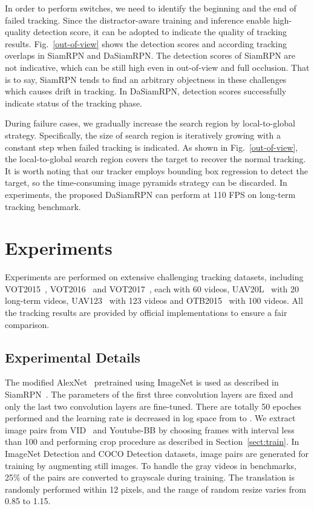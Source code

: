 \documentclass[runningheads]{llncs}
\begin{document}
In order to perform switches, we need to identify the beginning and the end of failed tracking. Since the distractor-aware training and inference enable high-quality detection score, it can be adopted to indicate the quality of tracking results. Fig.~\ref{out-of-view} shows the detection scores and according tracking overlaps in SiamRPN and DaSiamRPN. The detection scores of SiamRPN are not indicative, which can be still high even in out-of-view and full occlusion. That is to say, SiamRPN tends to find an arbitrary objectness in these challenges which causes drift in tracking. In DaSiamRPN, detection scores successfully indicate status of the tracking phase.

During failure cases, we gradually increase the search region by local-to-global strategy. Specifically, the size of search region is iteratively growing with a constant step when failed tracking is indicated. As shown in Fig.~\ref{out-of-view}, the local-to-global search region covers the target to recover the normal tracking. It is worth noting that our tracker employs bounding box regression to detect the target, so the time-consuming image pyramids strategy can be discarded. In experiments, the proposed DaSiamRPN can perform at 110 FPS on long-term tracking benchmark.







\section{Experiments}

Experiments are performed on extensive challenging tracking datasets,
including VOT2015~\cite{VOT2015}, VOT2016~\cite{VOT2016} and VOT2017~\cite{VOT2017}, each with 60 videos, UAV20L~\cite{UAV} with 20 long-term videos, UAV123~\cite{UAV} with 123 videos and OTB2015~\cite{OTB2015} with 100 videos. All the tracking results are provided by official implementations to ensure a fair comparison.


\subsection{Experimental Details}

The modified AlexNet~\cite{AlexNet} pretrained using ImageNet \cite{ILSVRC15} is used as described in SiamRPN~\cite{SiamRPN}.
The parameters of the first three convolution layers are fixed and only the last two convolution
layers are fine-tuned. There are totally 50 epoches performed and the learning rate is decreased in log space from  to .
We extract image pairs from VID~\cite{ILSVRC15} and Youtube-BB \cite{YouTubeBB} by choosing frames with interval less than 100 and performing crop procedure as described in Section~\ref{sect:train}. In ImageNet Detection \cite{ILSVRC15} and COCO Detection \cite{COCO} datasets, image pairs are generated for training by augmenting still images.
To handle the gray videos in benchmarks, 25\% of the pairs are converted to grayscale during training. The translation is randomly performed within 12 pixels, and the range of random resize varies from 0.85 to 1.15. 
\end{document}
